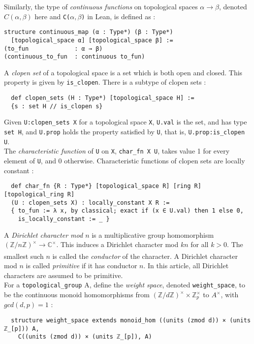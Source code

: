 \documentclass[11pt]{article}
\newcommand{\lean}[1]{\texttt{#1}\xspace} %
\begin{document}
Similarly, the type of \textit{continuous functions} on topological spaces $\alpha \to \beta$, 
denoted $C(\alpha, \beta)$ here and \lean{C($\alpha, \beta$)} in Lean, is defined as :
\begin{lstlisting}
structure continuous_map (α : Type*) (β : Type*) 
  [topological_space α] [topological_space β] :=
(to_fun             : α → β)
(continuous_to_fun  : continuous to_fun)
\end{lstlisting}

A \textit{clopen set} of a topological space is a set which is both open and closed. This property is given by \lean{is\_clopen}. 
There is a subtype of clopen sets :
\begin{lstlisting}
  def clopen_sets (H : Type*) [topological_space H] := 
  {s : set H // is_clopen s}
\end{lstlisting}

Given \lean{U:clopen\_sets X} for a topological space \lean{X}, \lean{U.val} is the set, and has type \lean{set H}, and \lean{U.prop} holds the property satisfied by 
\lean{U}, that is, \lean{U.prop:is\_clopen U}. \\

The \textit{characteristic function} of \lean{U} on \lean{X}, \lean{char\_fn X U}, takes value 1
for every element of \lean{U}, and 0 otherwise. Characteristic functions of clopen sets are locally
constant : 
\begin{lstlisting}
  def char_fn {R : Type*} [topological_space R] [ring R] [topological_ring R]
  (U : clopen_sets X) : locally_constant X R := 
  { to_fun := λ x, by classical; exact if (x ∈ U.val) then 1 else 0,
    is_locally_constant := _ } 
\end{lstlisting} 

A \textit{Dirichlet character mod $n$} is a multiplicative group homomorphism 
$(\mathbb{Z}/n\mathbb{Z})^{\times} \xrightarrow[]{} \mathbb{C}^{\times}$. This induces a Dirichlet 
character mod $kn$ for all $k > 0$. The smallest such $n$ is called the \textit{conductor} of the character. 
A Dirichlet character mod $n$ is called \textit{primitive} if it has conductor $n$. In this article, all 
Dirichlet characters are assumed to be primitive. \\

For a \lean{topological\_group} A, define the \textit{weight space}, denoted \lean{weight\_space}, to be the
continuous monoid homomorphisms from
$(\mathbb{Z}/d\mathbb{Z})^{\times} \times \mathbb{Z}_p^{\times}$ to $A^{\times}$, with $gcd(d,p) = 1$ : 
\begin{lstlisting}
  structure weight_space extends monoid_hom ((units (zmod d)) × (units ℤ_[p])) A,
    C((units (zmod d)) × (units ℤ_[p]), A)
\end{lstlisting}
\end{document}
